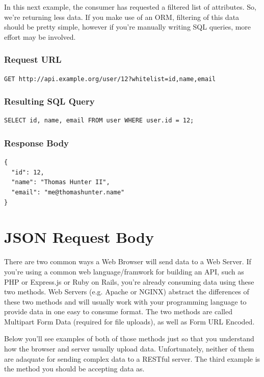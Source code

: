 \documentclass{book}
\begin{document}
In this next example, the consumer has requested a filtered list of attributes. So, we're returning less data. If you make use of an ORM, filtering of this data should be pretty simple, however if you're manually writing SQL queries, more effort may be involved.

\subsubsection{Request URL}

\begin{verbatim}
GET http://api.example.org/user/12?whitelist=id,name,email
\end{verbatim}

\subsubsection{Resulting SQL Query}

\begin{verbatim}
SELECT id, name, email FROM user WHERE user.id = 12;
\end{verbatim}

\subsubsection{Response Body}

\begin{verbatim}
{
  "id": 12,
  "name": "Thomas Hunter II",
  "email": "me@thomashunter.name"
}
\end{verbatim}


\section{JSON Request Body}

There are two common ways a Web Browser will send data to a Web Server. If you're using a common web language/framwork for building an API, such as PHP or Express.js or Ruby on Rails, you're already consuming data using these two methods. Web Servers (e.g. Apache or NGINX) abstract the differences of these two methods and will usually work with your programming language to provide data in one easy to consume format. The two methods are called Multipart Form Data (required for file uploads), as well as Form URL Encoded.

Below you'll see examples of both of those methods just so that you understand how the browser and server usually upload data. Unfortunately, neither of them are adaquate for sending complex data to a RESTful server. The third example is the method you should be accepting data as.
\end{document}
